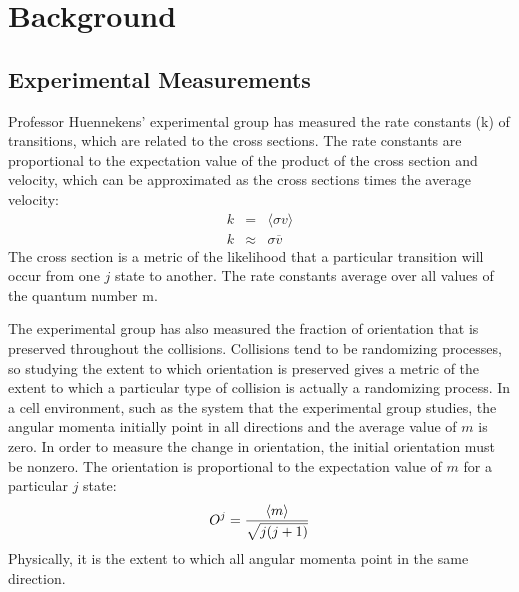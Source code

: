 \documentclass[letterpaper,titlepage,12pt]{article}
\begin{document}
\newpage
\section{Background}
\subsection{Experimental Measurements}
Professor Huennekens' experimental group has measured the rate constants (k) of
transitions, which are related to the cross sections.  The rate constants are
proportional to the expectation value of the product of the cross section and
velocity, which can be approximated as the cross sections times the average
velocity:
\begin{eqnarray}
    k&=&\langle\sigma v\rangle \nonumber\\
    k&\approx& \sigma \overline{v}
\end{eqnarray}
The cross section is a metric of the likelihood that a particular
transition will occur from one \(j\) state to another.  The rate constants average
over all values of the quantum number m.

The experimental group has also measured the fraction of orientation that is
preserved throughout the collisions.  Collisions tend to be randomizing processes, so
studying the extent to which orientation is preserved gives a metric of the
extent to which a particular type of collision is actually a randomizing
process.  In a cell environment, such as the system that the experimental group
studies, the angular momenta initially point in all directions and the average
value of \(m\) is zero.  In order to measure the change in orientation, the initial
orientation must be nonzero.  The orientation is proportional to the
expectation value of \(m\) for a particular \(j\) state:
\begin{equation}
    O^j={{\langle m\rangle}\over{\sqrt{j(j+1)}}}
    \label{eq:orientation}
\end{equation}
Physically, it is the extent to which all angular momenta point in the same direction.

\newpage
\end{document}
